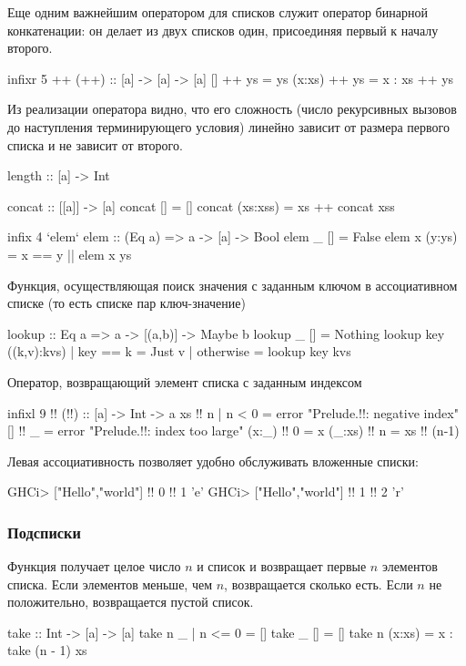 \documentclass[11pt,a4paper]{article}
\begin{document}
Еще одним важнейшим оператором для списков служит оператор бинарной конкатенации: он делает из двух списков один, присоединяя первый к началу второго.
\begin{hscode}
infixr 5 ++
(++) :: [a] -> [a] -> [a]
[] ++ ys = ys
(x:xs) ++ ys = x : xs ++ ys
\end{hscode}
Из реализации оператора видно, что его сложность (число рекурсивных вызовов до наступления терминирующего условия) линейно зависит от размера первого списка и не зависит от второго.

\begin{hscode}
length :: [a] -> Int

concat :: [[a]] -> [a]
concat [] = []
concat (xs:xss) = xs ++ concat xss

infix 4 `elem`
elem :: (Eq a) => a -> [a] -> Bool
elem _ [] = False
elem x (y:ys) = x == y || elem x ys
\end{hscode}

Функция, осуществляющая поиск значения с заданным ключом в ассоциативном списке (то есть списке пар ключ-значение)
\begin{hscode}
lookup :: Eq a => a -> [(a,b)] -> Maybe b
lookup _ [] = Nothing
lookup key ((k,v):kvs)
  | key == k = Just v
  | otherwise = lookup key kvs
\end{hscode}

Оператор, возвращающий элемент списка с заданным индексом
\begin{hscode}
infixl 9 !!
(!!) :: [a] -> Int -> a
xs     !! n | n < 0 = error "Prelude.!!: negative index"
[]     !! _         = error "Prelude.!!: index too large"
(x:_)  !! 0         = x
(_:xs) !! n         = xs !! (n-1)
\end{hscode}
Левая ассоциативность позволяет удобно обслуживать вложенные списки:
\begin{hscode}
GHCi> ["Hello","world"] !! 0 !! 1
'e'
GHCi> ["Hello","world"] !! 1 !! 2
'r'
\end{hscode}
\subsubsection{Подсписки}
Функция  получает целое число $ n$ и список и возвращает первые $ n$ элементов списка. Если элементов меньше, чем $ n$, возвращается сколько есть. Если $ n$ не положительно, возвращается пустой список.
\begin{hscode}
take :: Int -> [a] -> [a]
take n _ | n <= 0 = []
take _ []         = []
take n (x:xs)     = x : take (n - 1) xs
\end{hscode}
\end{document}
